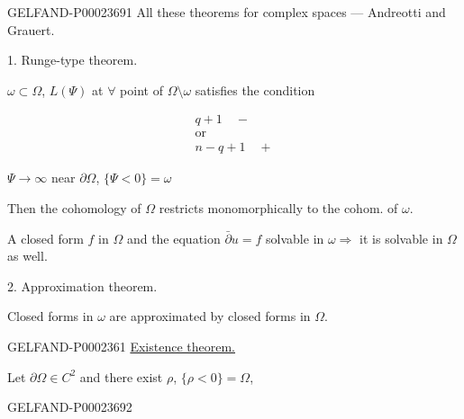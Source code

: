 \begin{GelfandAdjacentEvidence}{GELFAND-P000236}{91}
All these theorems for complex spaces — Andreotti and Grauert.



1. Runge-type theorem.



$\omega\subset\Omega$, $L (\Psi)$ at $\forall$ point of $\Omega\setminus\omega$ satisfies the condition



\begin{gather*}
 q+1\quad -\\
 \text{or}\\
 n-q+1\quad +
\end{gather*}



$\Psi\to\infty$ near $\partial\Omega$, $\{\Psi<0\}=\omega$



Then the cohomology of $\Omega$ restricts monomorphically to the cohom. of $\omega$.



A closed form $f$ in $\Omega$ and the equation $\bar\partial u=f$ solvable in $\omega\Rightarrow$ it is solvable in $\Omega$ as well.



2. Approximation theorem.



Closed forms in $\omega$ are approximated by closed forms in $\Omega$.




\end{GelfandAdjacentEvidence}\begin{GelfandAdjacentEvidence}{GELFAND-P000236}{1}
\underline{Existence theorem.}

Let $\partial\Omega\in C^2$ and there exist $\rho$, $\{\rho<0\}=\Omega$,






\end{GelfandAdjacentEvidence}\begin{GelfandAdjacentEvidence}{GELFAND-P000236}{92}



\end{GelfandAdjacentEvidence}
